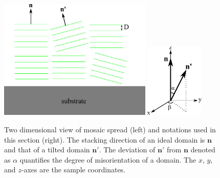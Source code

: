 \begin{figure}
  \centering
  \includegraphics[width=0.65\textwidth]{figures/ripple/mosaic/stack}
  \quad
  \includegraphics[width=0.25\textwidth]{figures/ripple/mosaic/spherical_coordinates}
  \caption[Two dimensional view of mosaic spread (left) and 
  notations used in this section (right)]
  {Two dimensional view of mosaic spread (left) and 
  notations used in this section (right). 
  The stacking direction of an ideal
  domain is $\mathbf{n}$ and that of a tilted domain $\mathbf{n'}$. 
  The deviation of $\mathbf{n'}$ from $\mathbf{n}$ denoted as $\alpha$
  quantifies the degree of misorientation of a domain. 
  The $x$, $y$, and $z$-axes are the sample coordinates.}
  \label{fig:spherical_coordinates}
\end{figure}

